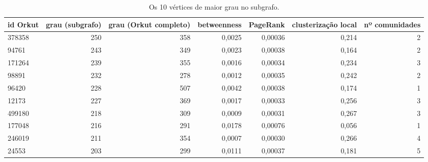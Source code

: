 \begin{table}[ht]
\centering
\caption{Os 10 vértices de maior grau no subgrafo.}
\label{tab:hubs}
\small
\begin{tabular}{lrrrrrr}
\hline
id Orkut & grau (subgrafo) & grau (Orkut completo) & betweenness & PageRank & clusterização local & nº comunidades \\
\hline
378358 & 250 & 358 & 0,0025 & 0,00036 & 0,214 & 2 \\
94761 & 243 & 349 & 0,0023 & 0,00038 & 0,164 & 2 \\
171264 & 239 & 355 & 0,0016 & 0,00034 & 0,234 & 3 \\
98891 & 232 & 278 & 0,0012 & 0,00035 & 0,242 & 2 \\
96420 & 228 & 507 & 0,0042 & 0,00038 & 0,174 & 1 \\
12173 & 227 & 369 & 0,0017 & 0,00033 & 0,256 & 3 \\
499180 & 218 & 309 & 0,0009 & 0,00031 & 0,267 & 3 \\
177048 & 216 & 291 & 0,0178 & 0,00076 & 0,056 & 1 \\
246019 & 211 & 354 & 0,0007 & 0,00030 & 0,266 & 4 \\
24553 & 203 & 299 & 0,0111 & 0,00037 & 0,181 & 5 \\
\hline
\end{tabular}
\end{table}

